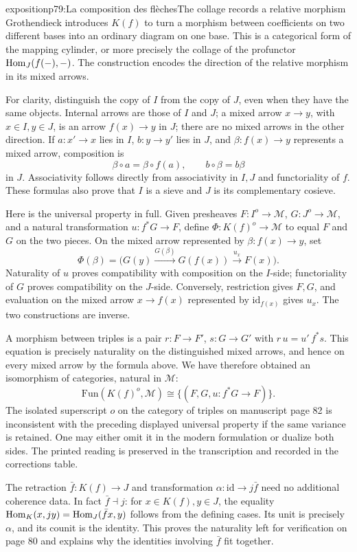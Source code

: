 \begin{dcomment}{exposition}{p79:La composition des flèches}{The collage records a relative morphism}
Grothendieck introduces \(K(f)\) to turn a morphism between coefficients on two different bases into an ordinary diagram on one base. This is a categorical form of the mapping cylinder, or more precisely the collage of the profunctor \(\mathrm{Hom}_J(f(-),-)\). The construction encodes the direction of the relative morphism in its mixed arrows.

For clarity, distinguish the copy of \(I\) from the copy of \(J\), even when they have the same objects. Internal arrows are those of \(I\) and \(J\); a mixed arrow \(x\to y\), with \(x\in I,y\in J\), is an arrow \(f(x)\to y\) in \(J\); there are no mixed arrows in the other direction. If \(a:x'\to x\) lies in \(I\), \(b:y\to y'\) lies in \(J\), and \(\beta:f(x)\to y\) represents a mixed arrow, composition is
\[
 \beta\circ a=\beta\circ f(a),\qquad
 b\circ\beta=b\beta
\]
in \(J\). Associativity follows directly from associativity in \(I,J\) and functoriality of \(f\). These formulas also prove that \(I\) is a sieve and \(J\) is its complementary cosieve.

Here is the universal property in full. Given presheaves \(F:I^o\to\mathcal M\), \(G:J^o\to\mathcal M\), and a natural transformation \(u:f^*G\to F\), define \(\Phi:K(f)^o\to\mathcal M\) to equal \(F\) and \(G\) on the two pieces. On the mixed arrow represented by \(\beta:f(x)\to y\), set
\[
 \Phi(\beta)=
 \bigl(G(y)\xrightarrow{G(\beta)}G(f(x))
       \xrightarrow{u_x}F(x)\bigr).
\]
Naturality of \(u\) proves compatibility with composition on the \(I\)-side; functoriality of \(G\) proves compatibility on the \(J\)-side. Conversely, restriction gives \(F,G\), and evaluation on the mixed arrow \(x\to f(x)\) represented by \(\mathrm{id}_{f(x)}\) gives \(u_x\). The two constructions are inverse.

A morphism between triples is a pair \(r:F\to F'\), \(s:G\to G'\) with \(r\,u=u'\,f^*s\). This equation is precisely naturality on the distinguished mixed arrows, and hence on every mixed arrow by the formula above. We have therefore obtained an isomorphism of categories, natural in \(\mathcal M\):
\[
 \mathrm{Fun}(K(f)^o,\mathcal M)
 \cong\{(F,G,u:f^*G\to F)\}.
\]
The isolated superscript \(o\) on the category of triples on manuscript page 82 is inconsistent with the preceding displayed universal property if the same variance is retained. One may either omit it in the modern formulation or dualize both sides. The printed reading is preserved in the transcription and recorded in the corrections table.

The retraction \(\bar f:K(f)\to J\) and transformation \(\alpha:\mathrm{id}\to j\bar f\) need no additional coherence data. In fact \(\bar f\dashv j\): for \(x\in K(f),y\in J\), the equality
\(\mathrm{Hom}_K(x,jy)=\mathrm{Hom}_J(\bar f x,y)\) follows from the defining cases. Its unit is precisely \(\alpha\), and its counit is the identity. This proves the naturality left for verification on page 80 and explains why the identities involving \(\bar f\) fit together.
\end{dcomment}


